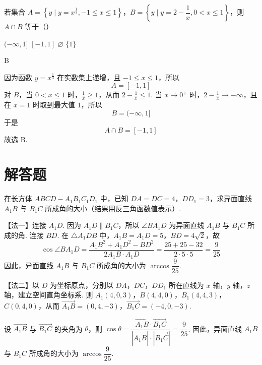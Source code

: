 \begin{problem}
若集合 \(A=\left\{y\mid y=x^{\frac13},-1\le x\le1\right\}\)，\(B=\left\{y\mid y=2-\dfrac1x,0<x\le1\right\}\)，则 \(A\cap B\) 等于（\quad）

\choices
    {\((-\infty,1]\)}
    {\([-1,1]\)}
    {\(\varnothing\)}
    {\(\{1\}\)}
\end{problem}

\begin{answer}
B
\end{answer}

\begin{solution}
因为函数 \(y=x^{\frac13}\) 在实数集上递增，且 \(-1\le x\le1\)，所以
\[
A=\left[-1,1\right]
\]
对 \(B\)，当 \(0<x\le1\) 时，\(\frac1x\ge1\)，从而 \(2-\frac1x\le1\). 当 \(x\to0^+\) 时，\(2-\frac1x\to-\infty\)，且在 \(x=1\) 时取到最大值 \(1\)，所以
\[
B=(-\infty,1]
\]
于是
\[
A\cap B=[-1,1]
\]
故选 B.
\end{solution}

\section{解答题}

\begin{problem}
在长方体 \(ABCD-A_1B_1C_1D_1\) 中，已知 \(DA=DC=4\)，\(DD_1=3\)，求异面直线 \(A_1B\) 与 \(B_1C\) 所成角的大小（结果用反三角函数值表示）.

\end{problem}

\begin{solution}
【法一】连接 \(A_1D\). 因为 \(A_1D\parallel B_1C\)，所以 \(\angle BA_1D\) 为异面直线 \(A_1B\) 与 \(B_1C\) 所成的角. 连接 \(BD\). 在 \(\triangle A_1DB\) 中，\(A_1B=A_1D=5\)，\(BD=4\sqrt2\)，故
\[
\cos\angle BA_1D=\dfrac{A_1B^2+A_1D^2-BD^2}{2A_1B\cdot A_1D}=\dfrac{25+25-32}{2\cdot5\cdot5}=\dfrac{9}{25}
\]
因此，异面直线 \(A_1B\) 与 \(B_1C\) 所成角的大小为 \(\arccos\dfrac{9}{25}\).


【法二】以 \(D\) 为坐标原点，分别以 \(DA\)，\(DC\)，\(DD_1\) 所在直线为 \(x\) 轴，\(y\) 轴，\(z\) 轴，建立空间直角坐标系. 则 \(A_1(4,0,3)\)，\(B(4,4,0)\)，\(B_1(4,4,3)\)，\(C(0,4,0)\)，从而 \(\overrightarrow{A_1B}=(0,4,-3)\)，\(\overrightarrow{B_1C}=(-4,0,-3)\).


设 \(\overrightarrow{A_1B}\) 与 \(\overrightarrow{B_1C}\) 的夹角为 \(\theta\)，则
\(\cos\theta=\dfrac{\overrightarrow{A_1B}\cdot\overrightarrow{B_1C}}{|\overrightarrow{A_1B}|\cdot|\overrightarrow{B_1C}|}=\dfrac{9}{25}\).
因此，异面直线 \(A_1B\) 与 \(B_1C\) 所成角的大小为 \(\arccos\dfrac{9}{25}\).
\end{solution}

